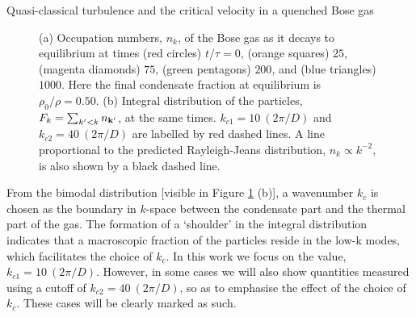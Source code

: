 \begin{chapter}{\label{cha:nonequib}Quasi-classical turbulence and the critical velocity in a quenched Bose gas}
\begin{figure}
\begin{center}
%
	  \end{center}%
  \caption{\label{fig:occupation} (a) Occupation numbers, $n_k$, of the Bose gas as it decays to equilibrium at times (red circles) $t/\tau=0$, (orange squares) $25$, (magenta diamonds) $75$, (green pentagons) $200$, and (blue triangles) $1000$. Here the final condensate fraction at equilibrium is $\rho_0/\rho = 0.50$. (b) Integral distribution of the particles, $F_k = \sum_{k'<k} n_{\bf k'}$, at the same times. $k_{c1} = 10~(2\pi/D)$ and $k_{c2} = 40~(2\pi/D)$ are labelled by red dashed lines. A line proportional to the predicted Rayleigh-Jeans distribution, $n_k \propto k^{-2}$, is also shown by a black dashed line.}
\end{figure}



From the bimodal distribution [visible in Figure \ref{fig:occupation} (b)], a wavenumber $k_c$ is chosen as the boundary in $k$-space between the condensate part and the thermal part of the gas. The formation of a `shoulder' in the integral distribution indicates that a macroscopic fraction of the particles reside in the low-k modes, which facilitates the choice of $k_c$. In this work we focus on the value, $k_{c1} = 10~(2\pi/D)$. However, in some cases we will also show quantities measured using a cutoff of $k_{c2} = 40~(2\pi/D)$, so as to emphasise the effect of the choice of $k_{c}$. These cases will be clearly marked as such.


\end{chapter}
